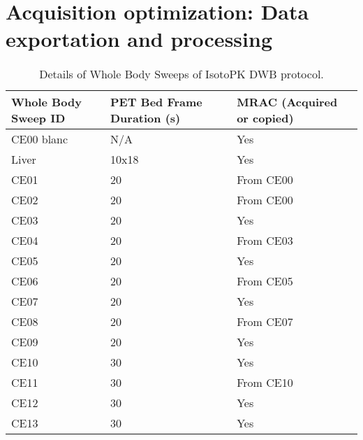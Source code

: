 
\chapter{Acquisition optimization: Data exportation and processing}
\label{chap:AppendixA}

\begin{table}[]
\centering
\label{tab:IsotPK_CE_details}
\caption{Details of Whole Body Sweeps of IsotoPK DWB protocol.}
\begin{tabular}{|l|l|l|}
\toprule
\textbf{Whole Body Sweep ID} & \textbf{PET Bed Frame Duration (s)}                   & \textbf{MRAC (Acquired or copied)} \\
\midrule
CE00 blanc          & {N/A}                                          & Yes  \\
Liver               & 10x18                                          & Yes  \\
CE01                & 20                                             & From CE00     \\
CE02                & 20                                             & From CE00     \\
CE03                & 20                                             & Yes           \\
CE04                & 20                                             & From CE03     \\
CE05                & 20                                             & Yes  \\
CE06                & 20                                             & From CE05     \\
CE07                & 20                                             & Yes  \\
CE08                & 20                                             & From CE07     \\
CE09                & 20                                             & Yes  \\
CE10                & 30                                             & Yes  \\
CE11                & 30                                             & From CE10     \\
CE12                & 30                                             & Yes  \\
CE13                & 30                                             & Yes  \\

\end{tabular}
\end{table}

